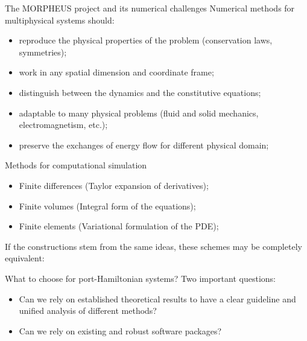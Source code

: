 \documentclass{beamer}
\begin{document}
\begin{frame}{The MORPHEUS project and its numerical challenges}
	Numerical methods for multiphysical systems should:
	\begin{itemize}
		\item reproduce the physical properties of the problem (conservation laws, symmetries);
		\item work in any spatial dimension and coordinate frame;
		\item distinguish between the dynamics and the constitutive equations;
		\item adaptable to many physical problems (fluid and solid mechanics, electromagnetism, etc.);
		\item preserve the exchanges of energy flow for different physical domain;
	\end{itemize}
\end{frame}

\begin{frame}{Methods for computational simulation}
	\begin{itemize}
		\item Finite differences (Taylor expansion of derivatives);
		\item Finite volumes (Integral form of the equations);
		\item Finite elements (Variational formulation of the PDE);
	\end{itemize}
\vspace{1cm}
If the constructions stem from the same ideas, these schemes may be completely equivalent:\\

\end{frame}

\begin{frame}{What to choose for port-Hamiltonian systems?}
	Two important questions:
		\begin{itemize}
			\item Can we rely on established theoretical results to have a clear guideline and unified analysis of different methods?
			\item Can we rely on existing and robust software packages? 
	\end{itemize}
	
\end{frame}
\end{document}
